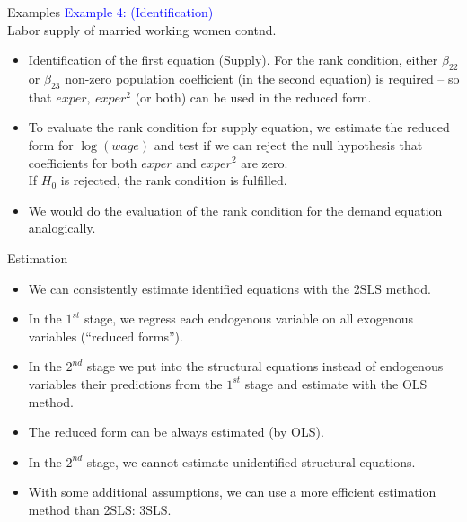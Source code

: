 \documentclass[usenames,dvipsnames]{beamer}
\begin{document}
\begin{frame}{Examples}
\textcolor{Blue}{Example 4: (Identification)}\\ Labor supply of married working women contnd.\\
\bigskip
\begin{itemize}
\item Identification of the first equation (Supply). For the rank condition, either $\beta_{22}$ or $\beta_{23}$ non-zero population coefficient (in the second equation) is required -- so that $\textit{exper},~\textit{exper}^2$ (or both) can be used in the reduced form.
\medskip
\item To evaluate the rank condition for supply equation, we estimate the reduced form for $\log(\textit{wage})$ and test if we can reject the null hypothesis that coefficients for both  $exper$ and $\textit{exper}^2$ are zero. \\If $H_0$ is rejected, the rank condition is fulfilled.\\
\medskip
\item We would do the evaluation of the rank condition for the demand equation analogically.
\end{itemize}
\end{frame}
\begin{frame}{Estimation}
\begin{itemize}
\item We can consistently estimate identified equations with the 2SLS method. \vspace{0.2cm}
\item In the $1^{st}$ stage, we regress each endogenous variable on all exogenous variables (``reduced forms'').
\vspace{0.2cm}
\item In the $2^{nd}$ stage we put into the structural equations instead of endogenous variables their predictions from the $1^{st}$ stage and estimate with the OLS method. 
\vspace{0.2cm}
\item The reduced form can be always estimated (by OLS).
\vspace{0.2cm}
\item In the $2^{nd}$ stage, we cannot estimate unidentified structural equations. 
\vspace{0.2cm}
\item With some additional assumptions, we can use a more efficient estimation method than 2SLS: 3SLS.
\end{itemize}
\end{frame}
\end{document}
